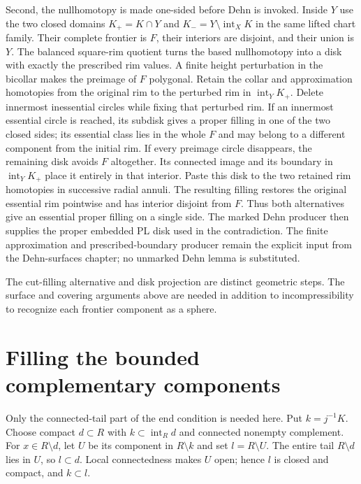 Second, the nullhomotopy is made one-sided before Dehn is invoked. Inside
$Y$ use the two closed domains $K_+=K\cap Y$ and
$K_-=Y\setminus\operatorname{int}_X K$ in the same lifted chart family.
Their complete frontier is $F$, their interiors are disjoint, and their union
is $Y$. The balanced square-rim quotient turns the based nullhomotopy into a
disk with exactly the prescribed rim values. A finite height perturbation in
the bicollar makes the preimage of $F$ polygonal. Retain the collar and
approximation homotopies from the original rim to the perturbed rim in
$\operatorname{int}_Y K_+$. Delete innermost inessential circles while
fixing that perturbed rim. If an innermost essential circle is reached,
its subdisk gives a proper filling in one of the two closed sides; its
essential class lies in the whole $F$ and may belong to a different
component from the initial rim. If every preimage circle disappears, the
remaining disk avoids $F$ altogether. Its connected image and its boundary
in $\operatorname{int}_Y K_+$ place it entirely in that interior. Paste
this disk to the two retained rim homotopies in successive radial annuli.
The resulting filling restores the original essential rim pointwise and
has interior disjoint from $F$. Thus both alternatives give an essential
proper filling on a single side. The marked Dehn producer then supplies
the proper embedded PL disk used in the contradiction. The finite approximation and
prescribed-boundary producer remain the explicit input from the Dehn-surfaces
chapter; no unmarked Dehn lemma is substituted.

The cut-filling alternative and disk projection are distinct geometric
steps. The surface and covering arguments above are needed in addition
to incompressibility to recognize each frontier component as a sphere.

\section{Filling the bounded complementary components}
\label{sec:compact-core-filling}

Only the connected-tail part of the end condition is needed here. Put
$k=j^{-1}K$. Choose compact $d\subset R$ with
$k\subset\operatorname{int}_R d$ and connected nonempty complement.
For $x\in R\setminus d$, let $U$ be its component in $R\setminus k$
and set $l=R\setminus U$. The entire tail $R\setminus d$ lies in $U$,
so $l\subset d$. Local connectedness makes $U$ open; hence $l$ is
closed and compact, and $k\subset l$.

